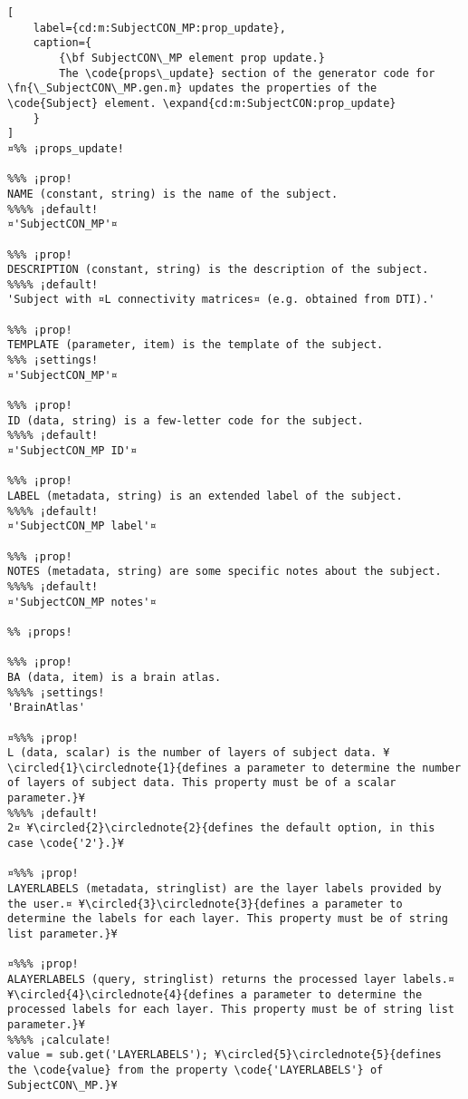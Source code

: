 \documentclass{tufte-handout}
\begin{document}
\begin{lstlisting}[
	label={cd:m:SubjectCON_MP:prop_update},
	caption={
		{\bf SubjectCON\_MP element prop update.}
		The \code{props\_update} section of the generator code for \fn{\_SubjectCON\_MP.gen.m} updates the properties of the \code{Subject} element. \expand{cd:m:SubjectCON:prop_update}
	}
]
¤%% ¡props_update!

%%% ¡prop!
NAME (constant, string) is the name of the subject.
%%%% ¡default!
¤'SubjectCON_MP'¤

%%% ¡prop!
DESCRIPTION (constant, string) is the description of the subject.
%%%% ¡default!
'Subject with ¤L connectivity matrices¤ (e.g. obtained from DTI).'

%%% ¡prop!
TEMPLATE (parameter, item) is the template of the subject.
%%% ¡settings!
¤'SubjectCON_MP'¤

%%% ¡prop!
ID (data, string) is a few-letter code for the subject.
%%%% ¡default!
¤'SubjectCON_MP ID'¤

%%% ¡prop!
LABEL (metadata, string) is an extended label of the subject.
%%%% ¡default!
¤'SubjectCON_MP label'¤

%%% ¡prop!
NOTES (metadata, string) are some specific notes about the subject.
%%%% ¡default!
¤'SubjectCON_MP notes'¤

%% ¡props!

%%% ¡prop!
BA (data, item) is a brain atlas.
%%%% ¡settings!
'BrainAtlas'

¤%%% ¡prop! 
L (data, scalar) is the number of layers of subject data. ¥\circled{1}\circlednote{1}{defines a parameter to determine the number of layers of subject data. This property must be of a scalar parameter.}¥
%%%% ¡default!
2¤ ¥\circled{2}\circlednote{2}{defines the default option, in this case \code{'2'}.}¥

¤%%% ¡prop! 
LAYERLABELS (metadata, stringlist) are the layer labels provided by the user.¤ ¥\circled{3}\circlednote{3}{defines a parameter to determine the labels for each layer. This property must be of string list parameter.}¥

¤%%% ¡prop!
ALAYERLABELS (query, stringlist) returns the processed layer labels.¤ ¥\circled{4}\circlednote{4}{defines a parameter to determine the processed labels for each layer. This property must be of string list parameter.}¥
%%%% ¡calculate!
value = sub.get('LAYERLABELS'); ¥\circled{5}\circlednote{5}{defines the \code{value} from the property \code{'LAYERLABELS'} of SubjectCON\_MP.}¥


\end{lstlisting}
\end{document}
